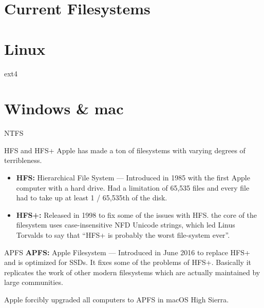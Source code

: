 \documentclass{lug}
\begin{document}



\section{Current Filesystems}

\section{Linux}
\begin{frame}{ext4}
\end{frame}

\section{Windows \& mac}
\begin{frame}{NTFS}
\end{frame}

\begin{frame}{HFS and HFS+}
    Apple has made a ton of filesystems with varying degrees of terribleness.
    \begin{itemize}
        \item \textbf{HFS:} Hierarchical File System --- Introduced in 1985 with
            the first Apple computer with a hard drive. Had a limitation of
            65,535 files and every file had to take up at least 1 / 65,535th of
            the disk.

        \item \textbf{HFS+:} Released in 1998 to fix some of the issues with
            HFS. the core of the filesystem uses case-insensitive NFD Unicode
            strings, which led Linus Torvalds to say that ``HFS+ is probably the
            worst file-system ever''.
    \end{itemize}
\end{frame}

\begin{frame}{APFS}
    \textbf{APFS:} Apple Filesystem --- Introduced in June 2016 to replace HFS+
    and is optimized for SSDs. It fixes some of the problems of HFS+. Basically
    it replicates the work of other modern filesystems which are actually
    maintained by large communities.

    Apple forcibly upgraded all computers to APFS in macOS High Sierra.
\end{frame}
\end{document}
